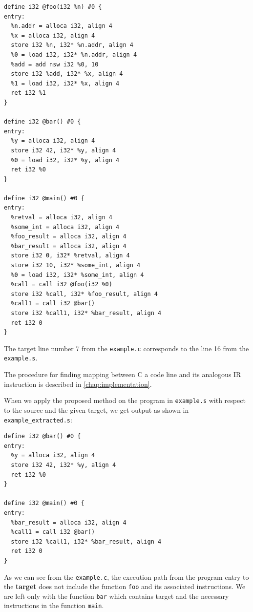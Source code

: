 \documentclass[12pt, twoside]{fithesis2}
\renewcommand{\_}{\leavevmode \kern0.07em\vbox{\hrule width0.4em}}
\begin{document}
\begin{verbatim}
define i32 @foo(i32 %n) #0 {
entry:
  %n.addr = alloca i32, align 4
  %x = alloca i32, align 4
  store i32 %n, i32* %n.addr, align 4
  %0 = load i32, i32* %n.addr, align 4
  %add = add nsw i32 %0, 10
  store i32 %add, i32* %x, align 4
  %1 = load i32, i32* %x, align 4
  ret i32 %1
}

define i32 @bar() #0 {
entry:
  %y = alloca i32, align 4
  store i32 42, i32* %y, align 4
  %0 = load i32, i32* %y, align 4
  ret i32 %0
}

define i32 @main() #0 {
entry:
  %retval = alloca i32, align 4
  %some_int = alloca i32, align 4
  %foo_result = alloca i32, align 4
  %bar_result = alloca i32, align 4
  store i32 0, i32* %retval, align 4
  store i32 10, i32* %some_int, align 4
  %0 = load i32, i32* %some_int, align 4
  %call = call i32 @foo(i32 %0)
  store i32 %call, i32* %foo_result, align 4
  %call1 = call i32 @bar()
  store i32 %call1, i32* %bar_result, align 4
  ret i32 0
}
\end{verbatim}

The target line number 7 from the \texttt{example.c}
corresponds to the line 16 from the \texttt{example.s}.

The procedure for finding mapping between C a code line and its analogous IR
instruction is described in \autoref{chap:implementation}.

When we apply the proposed method on the program in
\texttt{example.s} with respect to the source and the given target,
we get output as shown in \texttt{example_extracted.s}:

\begin{verbatim}
define i32 @bar() #0 {
entry:
  %y = alloca i32, align 4
  store i32 42, i32* %y, align 4
  ret i32 %0
}

define i32 @main() #0 {
entry:
  %bar_result = alloca i32, align 4
  %call1 = call i32 @bar()
  store i32 %call1, i32* %bar_result, align 4
  ret i32 0
}
\end{verbatim}

As we can see from the \texttt{example.c}, the execution path from
the program entry to the \textbf{target} does not include the function
\texttt{foo} and its associated instructions.
We are left only with the function \texttt{bar} which contains
target and the necessary instructions in the function \texttt{main}.
\end{document}

